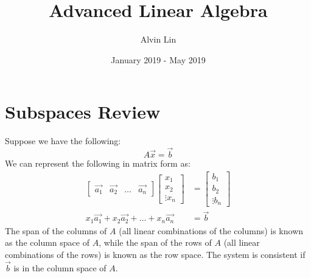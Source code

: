 \documentclass{math}
\title{Advanced Linear Algebra}
\author{Alvin Lin}
\date{January 2019 - May 2019}
\begin{document}
\maketitle

\section*{Subspaces Review}
Suppose we have the following:
\[ A\vec{x} = \vec{b} \]
We can represent the following in matrix form as:
\begin{align*}
  \begin{bmatrix}
    \vec{a_1} & \vec{a_2} & \dots & \vec{a_n}
  \end{bmatrix}\begin{bmatrix}
    x_1 \\ x_2 \\ \vdots x_n
  \end{bmatrix} &= \begin{bmatrix}
    b_1 \\ b_2 \\ \vdots b_n
  \end{bmatrix} \\
  x_1\vec{a_1}+x_2\vec{a_2}+\dots+x_n\vec{a_n} &= \vec{b}
\end{align*}
The span of the columns of \( A \) (all linear combinations of the columns)
is known as the column space of \( A \), while the span of the rows of \( A \)
(all linear combinations of the rows) is known as the row space. The system is
consistent if \( \vec{b} \) is in the column space of \( A \).
\end{document}
